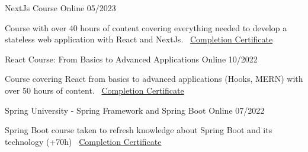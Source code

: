 \documentclass[]{awesome-cv}
\begin{document}
\vspace{4mm}
\begin{cventries}
	\vspace{2mm}
	\cventry
	{}
	{NextJs Course \vspace{-4mm}}
	{Online \vspace{-5mm}}
	{05/2023 \vspace{-5mm}}
	{\begin{cvsectionnormaltext} 
		\item{Course with over 40 hours of content covering everything needed to develop a stateless web application with React and NextJs.
		\newline \vspace{2mm} \faLink\ \href{https://www.udemy.com/certificate/UC-1ede8757-aa0d-406f-813a-8eaa400532c5/}{Completion Certificate}}
	\end{cvsectionnormaltext}}
    {}

	\cventry
	{}
	{React Course: From Basics to Advanced Applications \vspace{-4mm}}
	{Online \vspace{-5mm}}
	{10/2022 \vspace{-5mm}}
	{\begin{cvsectionnormaltext} 
		\item{Course covering React from basics to advanced applications (Hooks, MERN) with over 50 hours of content.
		\newline \vspace{2mm} \faLink\ \href{https://www.udemy.com/certificate/UC-fcb467ab-c089-419c-9b6a-afe97f894d14/}{Completion Certificate}}
	\end{cvsectionnormaltext}}
    {}

	\cventry
	{}
	{Spring University - Spring Framework and Spring Boot \vspace{-4mm}}
	{Online \vspace{-5mm}}
	{07/2022 \vspace{-5mm}}
	{\begin{cvsectionnormaltext} 
		\item{Spring Boot course taken to refresh knowledge about Spring Boot and its technology (+70h)
		\newline \vspace{2mm} \faLink\ \href{https://www.udemy.com/certificate/UC-ee0ce349-6915-479b-b038-5253aba9d0d8/}{Completion Certificate}}
	\end{cvsectionnormaltext}}
    {}


\end{cventries}
\end{document}
